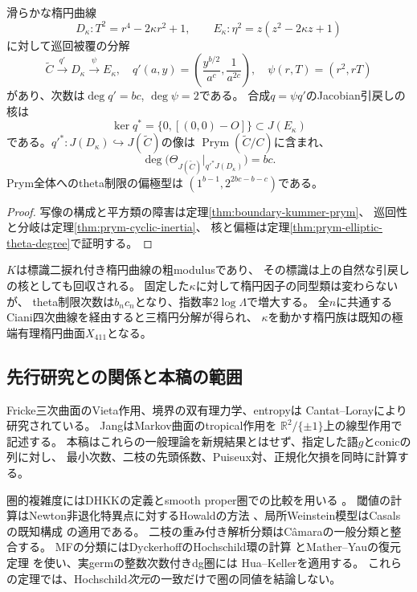 \documentclass[11pt,a4paper]{ltjsarticle}
\begin{document}
\begin{theorem}[Prymの二捩れ核と整数偏極]\label{thm:boundary-paper-prym}
滑らかな楕円曲線
\[
 D_\kappa:T^2=r^4-2\kappa r^2+1,\qquad
 E_\kappa:\eta^2=z(z^2-2\kappa z+1)
\]
に対して巡回被覆の分解
\[
 \widetilde C\xrightarrow{q'}D_\kappa\xrightarrow{\psi}E_\kappa,
 \quad
 q'(a,y)=\left(\frac{y^{b/2}}{a^c},\frac1{a^{2c}}\right),
 \quad \psi(r,T)=(r^2,rT)
\]
があり、次数は$\deg q'=bc$, $\deg\psi=2$である。
合成$q=\psi q'$のJacobian引戻しの核は
\[
 \ker q^*=\{0,[(0,0)-O]\}\subset J(E_\kappa)
\]
である。$q'^*:J(D_\kappa)\hookrightarrow J(\widetilde C)$の像は
$\operatorname{Prym}(\widetilde C/C)$に含まれ、
\[
 \deg\bigl(\Theta_{J(\widetilde C)}|_{q'^*J(D_\kappa)}\bigr)=bc.
\]
Prym全体へのtheta制限の偏極型は
$(1^{b-1},2^{2bc-b-c})$である。
\end{theorem}
\begin{proof}
写像の構成と平方類の障害は定理\ref{thm:boundary-kummer-prym}、
巡回性と分岐は定理\ref{thm:prym-cyclic-inertia}、
核と偏極は定理\ref{thm:prym-elliptic-theta-degree}で証明する。
\end{proof}
$K$は標識二捩れ付き楕円曲線の粗modulusであり、
その標識は上の自然な引戻しの核としても回収される。
固定した$\kappa$に対して楕円因子の同型類は変わらないが、
theta制限次数は$b_nc_n$となり、指数率$2\log\Lambda$で増大する。
全$n$に共通するCiani四次曲線を経由すると三楕円分解が得られ、
$\kappa$を動かす楕円族は既知の極端有理楕円曲面$X_{411}$となる。

\subsection{先行研究との関係と本稿の範囲}
Fricke三次曲面のVieta作用、境界の双有理力学、entropyは
Cantat--Loray\cite{CantatLorayCayley}により研究されている。
Jang\cite{JangBoundary}はMarkov曲面のtropical作用を
$\mathbb R^2/\{\pm1\}$上の線型作用で記述する。
本稿はこれらの一般理論を新規結果とはせず、指定した語$g$とconicの列に対し、
最小次数、二枝の先頭係数、Puiseux対、正規化欠損を同時に計算する。

圏的複雑度にはDHKKの定義とsmooth proper圏での比較を用いる
\cite{BoundaryDHKK}。
閾値の計算はNewton非退化特異点に対するHowaldの方法
\cite{BoundaryHowald}、局所Weinstein模型はCasalsの既知構成
\cite{BoundaryCasals}の適用である。
二枝の重み付き解析分類はC\^amara\cite{BoundaryCamara}の一般分類と整合する。
MFの分類にはDyckerhoffのHochschild環の計算
\cite{BoundaryDyckerhoff}とMather--Yauの復元定理
\cite{BoundaryMatherYau}を使い、実germの整数次数付きdg圏には
Hua--Keller\cite{BoundaryHuaKeller}を適用する。
これらの定理では、Hochschild\emph{次元}の一致だけで圏の同値を結論しない。
\end{document}
